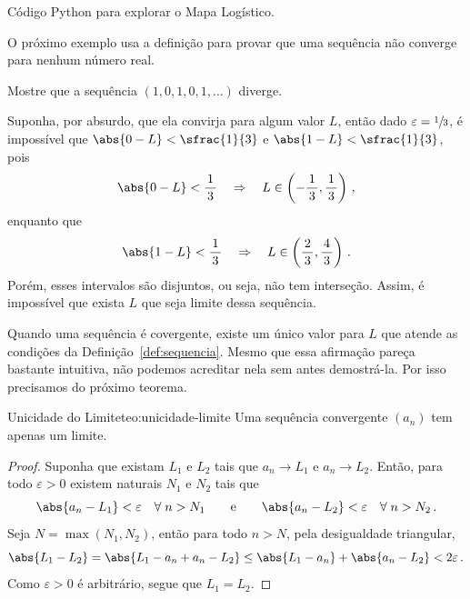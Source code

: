 {
  Código Python para explorar o Mapa Logístico.
}

O próximo exemplo usa a definição para provar que uma sequência não converge
para nenhum número real.

\begin{example}
    Mostre que a sequência $(1, 0, 1, 0, 1, \dots)$ diverge.

    \solution
    Suponha, por absurdo, que ela convirja para algum valor $L$,
    então dado $\varepsilon=\sfrac{1}{3}$, é impossível que
    $\abs{0-L}<\sfrac{1}{3}$ e $\abs{1-L}<\sfrac{1}{3}$, pois
    \[
      \abs{0-L}<\frac{1}{\,3\,}
      \quad \Rightarrow \quad
      L\in\left(-\frac{1}{\,3\,}, \frac{1}{\,3\,}\right) \,,
    \]
    enquanto que
    \[
      \abs{1-L}<\frac{1}{\,3\,}
      \quad \Rightarrow \quad
      L\in\left(\frac{2}{\,3\,}, \frac{4}{\,3\,}\right) \,.
    \]
    Porém, esses intervalos são disjuntos, ou seja, não tem interseção.
    Assim, é impossível que exista $L$ que seja limite dessa sequência.
\end{example}

Quando uma sequência é covergente, existe um único valor para $L$ que
atende as condições da Definição~\ref{def:sequencia}.
Mesmo que essa afirmação pareça bastante intuitiva, não podemos acreditar nela
sem antes demostrá-la. Por isso precisamos do próximo teorema.

\begin{teorema}{Unicidade do Limite}{teo:unicidade-limite}
    Uma sequência convergente $(a_n)$ tem apenas um limite.
\end{teorema}
\begin{proof}
    Suponha que existam $L_1$ e $L_2$ tais que $a_n\to L_1$ e $a_n\to L_2$.
    Então, para todo $\varepsilon>0$ existem naturais $N_1$ e $N_2$ tais que
    \[
      \abs{a_n-L_1}<\varepsilon \quad \forall \; n>N_1
      \qquad\text{e}\qquad
      \abs{a_n-L_2}<\varepsilon \quad \forall \; n>N_2 \,.
    \]
    Seja $N=\max(N_1, N_2)$, então para todo $n>N$, pela desigualdade triangular,
    \[
      \abs{L_1-L_2}
      =    \abs{L_1-a_n+a_n-L_2}
      \leq \abs{L_1-a_n} + \abs{a_n-L_2}
      <   2\varepsilon \,.
    \]
    Como $\varepsilon>0$ é arbitrário, segue que $L_1=L_2$.
\end{proof}

